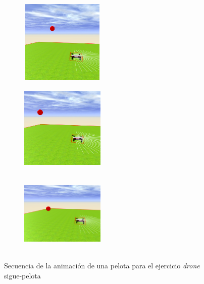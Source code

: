 \begin{figure}[H]
\begin{subfigure}[t]{0.2\textwidth}
    \includegraphics[width=4cm, height=4cm]{img/followBallTello6.png}
\label{fig:figure2_6}
\end{subfigure}\hfill
\begin{subfigure}[t]{0.2\textwidth}
    \includegraphics[width=4cm, height=4cm]{img/followBallTello7.png}
\label{fig:figure2_7}
\end{subfigure}\hfill
\begin{subfigure}[t]{0.2\textwidth}
    \includegraphics[width=4cm, height=4cm]{img/followBallTello8.png}
\label{fig:figure2_8}
\end{subfigure}

\caption{Secuencia de la animación de una pelota para el ejercicio \textit{drone} sigue-pelota}
\label{fig:secuenciaDrone}
\end{figure}

